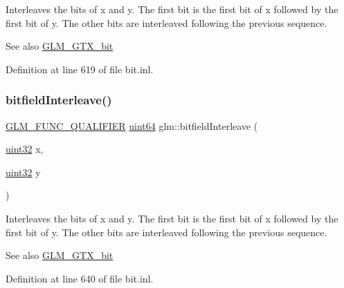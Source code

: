 Interleaves the bits of x and y. The first bit is the first bit of x followed by the first bit of y. The other bits are interleaved following the previous sequence.

\begin{DoxySeeAlso}{See also}
\hyperlink{group__gtx__bit}{G\+L\+M\+\_\+\+G\+T\+X\+\_\+bit} 
\end{DoxySeeAlso}


Definition at line 619 of file bit.\+inl.

\mbox{\label{group__gtx__bit_ga2bc87fd66f6f8471c1a46888360cef12}} 
\subsubsection{\texorpdfstring{bitfield\+Interleave()}{bitfieldInterleave()}\hspace{0.1cm}{\footnotesize\ttfamily [6/16]}}
{\footnotesize\ttfamily \hyperlink{setup_8hpp_a33fdea6f91c5f834105f7415e2a64407}{G\+L\+M\+\_\+\+F\+U\+N\+C\+\_\+\+Q\+U\+A\+L\+I\+F\+I\+ER} \hyperlink{group__gtc__type__precision_gae3632bf9b37da66233d78930dd06378a}{uint64} glm\+::bitfield\+Interleave (\begin{DoxyParamCaption}\item[{\hyperlink{group__gtc__type__precision_ga202b6a53c105fcb7e531f9b443518451}{uint32}}]{x,  }\item[{\hyperlink{group__gtc__type__precision_ga202b6a53c105fcb7e531f9b443518451}{uint32}}]{y }\end{DoxyParamCaption})}

Interleaves the bits of x and y. The first bit is the first bit of x followed by the first bit of y. The other bits are interleaved following the previous sequence.

\begin{DoxySeeAlso}{See also}
\hyperlink{group__gtx__bit}{G\+L\+M\+\_\+\+G\+T\+X\+\_\+bit} 
\end{DoxySeeAlso}


Definition at line 640 of file bit.\+inl.

\mbox{\label{group__gtx__bit_ga6dee2ce1c45805063bb7fc5f6fd8f5ca}} 
